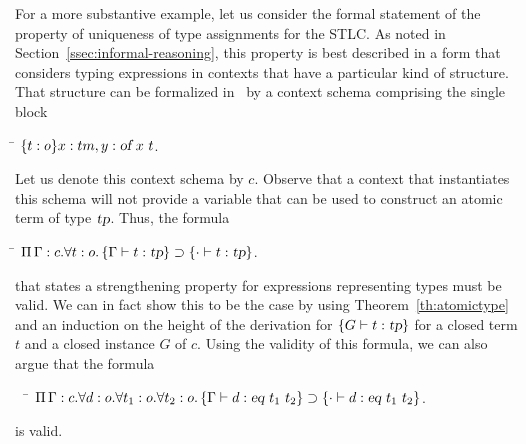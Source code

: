 For a more substantive example, let us consider the formal statement
of the property of uniqueness of type assignments for the STLC.
%
As noted in Section~\ref{ssec:informal-reasoning}, this property is
best described in a form that considers typing expressions in
contexts that have a particular kind of structure. 
%
That structure can be formalized in \logic\ by a context
schema comprising the single block
\begin{tabbing}
  \qquad\=\kill
  \> $\{t : o\}x:tm,y:\mbox{\sl of}\  x\  t$.
\end{tabbing}
%
Let us denote this context schema by $c$.
%
Observe that a context that instantiates this schema will not
provide a variable that can be used to construct an atomic term of
type $\mbox{\sl tp}$.
%
Thus, the formula 
\begin{tabbing}
  \qquad\=\kill
  \> $\Pi\,\Gamma : c.\forall t :o. \left\{\Gamma \vdash t : \mbox{\sl tp}\right\}\supset \left\{\cdot \vdash t:\mbox{\sl tp}\right\}$.
\end{tabbing}
that states a strengthening property for expressions representing
types must be valid. 
%
We can in fact show this to be the case by
using Theorem~\ref{th:atomictype} and an induction on the height of
the derivation for $\left\{G \vdash t : \mbox{\sl tp}\right\}$ for a closed term $t$ and a
closed instance $G$ of $c$.
%
Using the validity of this formula, we can also argue that the
formula 
\begin{tabbing}
  \ \ \=\kill
  \> $\Pi\,\Gamma : c.\forall d :o. \forall t_1 :o. \forall t_2 : o. \left\{\Gamma \vdash d : \mbox{\sl eq}\  t_1\  t_2\right\}\supset \left\{\cdot \vdash d:\mbox{\sl eq}\  t_1\  t_2\right\}$.
\end{tabbing}
is valid.

